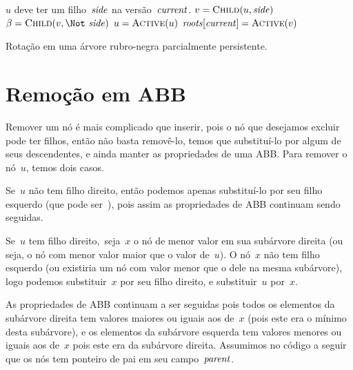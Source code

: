 \documentclass[../../main.tex]{subfiles}
\begin{document}
\begin{algorithm}
\begin{algorithmic}[1]
\Require $u$ deve ter um filho~$\mathit{side}$ na versão~$\mathit{current}$.
	\State $v = \Call{Child}{u, \side}$
	\State $\beta = \Call{Child}{v, \Not\ \side}$
	\State {}
	\State {}
	\State $u = \Call{Active}{u}$ \label{line:rotrb:active}
		\State {}
	\Else
		\State $\roots[\cur] = \Call{Active}{v}$ 
	\EndIf
	\State {}
\EndFunction
\end{algorithmic}
\caption{Rotação em uma árvore rubro-negra parcialmente persistente.} \label{lst:rotrb}
\end{algorithm}

\section{Remoção em ABB}

Remover um nó é mais complicado que inserir, pois o nó que desejamos excluir pode ter filhos, então não basta removê-lo, temos que substituí-lo por algum de seus descendentes, e ainda manter as propriedades de uma ABB. Para remover o nó~$u$, temos dois casos.

Se~$u$ não tem filho direito, então podemos apenas substituí-lo por seu filho esquerdo (que pode ser~), pois assim as propriedades de ABB continuam sendo seguidas.

Se~$u$ tem filho direito,~seja~$x$ o nó de menor valor em sua subárvore direita (ou seja, o nó com menor valor maior que o valor de~$u$). O nó~$x$ não tem filho esquerdo (ou existiria um nó com valor menor que o dele na mesma subárvore), logo podemos substituir~$x$ por seu filho direito, e substituir~$u$ por~$x$.

As propriedades de ABB continuam a ser seguidas pois todos os elementos da subárvore direita tem valores maiores ou iguais aos de~$x$ (pois este era o mínimo desta subárvore), e os elementos da subárvore esquerda tem valores menores ou iguais aos de~$x$ pois este era da subárvore direita. Assumimos no código a seguir que os nós tem ponteiro de pai em seu campo~$\mathit{parent}$.
\end{document}
